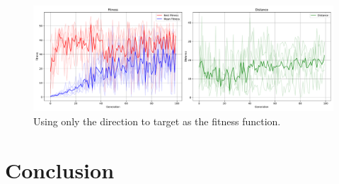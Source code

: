 \documentclass[sigconf]{acmart}
\begin{document}
\begin{figure}[H]
  \centering
  \includegraphics[width=0.95\linewidth]{imgs/result_Run_cx0.85_mut0.25_2024_1214_0636_dir_only.pdf}
  \caption{Using only the direction to target as the fitness function.}
  \label{fig:plot_dir}
\end{figure}
\section{Conclusion}



\end{document}
